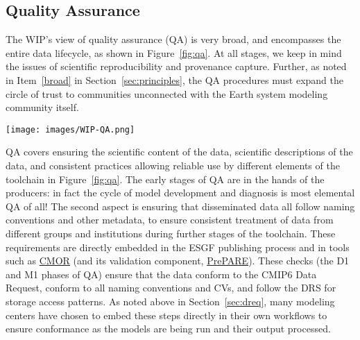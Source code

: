 \documentclass[gmd,manuscript]{copernicus}
\newcommand{\figref}[1] {\mbox{Figure   \ref{fig:#1}}}
\newcommand{\secref}[1] {\mbox{Section  \ref{sec:#1}}}
\begin{document}
\subsection{Quality Assurance}
\label{sec:qa}

The WIP's view of quality assurance (QA) is very broad, and
encompasses the entire data lifecycle, as shown in \figref{qa}. At all
stages, we keep in mind the issues of scientific reproducibility and
provenance capture. Further, as noted in Item~\ref{broad} in
\secref{principles}, the QA procedures must expand the circle of trust
to communities unconnected with the Earth system modeling community
itself.

\begin{figure*}
  \begin{center}
    \texttt{[image: images/WIP-QA.png]}
  \end{center}
  \caption{Schematic of the phases of quality assurance, with earlier
    stages in the hands of modeling centers (left), and more formal
    long-term data curation stages at right. Quality assurance is
    applied both to the data (D, above) as well as the metadata (M)
    describing the data. Figure courtesy Martina Stockhause, drawn
    from the WIP's Quality Assurance position paper.}
  \label{fig:qa}
\end{figure*}

QA covers ensuring the scientific content of the data, scientific
descriptions of the data, and consistent practices allowing reliable
use by different elements of the toolchain in \figref{qa}. The early
stages of QA are in the hands of the producers: in fact the cycle of
model development and diagnosis is most elemental QA of all! The
second aspect is ensuring that disseminated data all follow naming
conventions and other metadata, to ensure consistent treatment of data
from different groups and institutions during further stages of the
toolchain. These requirements are directly embedded in the ESGF
publishing process and in tools such as
\href{https://cmor.llnl.gov/}{CMOR} (and its validation component,
\href{https://goo.gl/ApvMJx}{PrePARE}). These checks (the D1 and M1 
phases of QA) ensure that the data conform to the CMIP6 Data Request, 
conform to all naming conventions and CVs, and follow the DRS for 
storage access patterns. As noted above in \secref{dreq}, many 
modeling centers have chosen to embed these steps directly in their 
own workflows to ensure conformance as the models are being run and 
their output processed.
\end{document}
